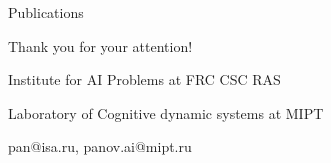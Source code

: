 \documentclass[default]{beamer}
\begin{document}
	\begin{frame}{Publications}
		
		\nocite{*}
		\printbibliography[keyword={fulllist}, resetnumbers=true]
	\end{frame}

	\begin{frame}
	
		\centering
		\Huge
		Thank you for your attention!
		\normalsize
		\par\bigskip
		\par\bigskip
		Institute for AI Problems at FRC CSC RAS
		\par\bigskip
		Laboratory of Cognitive dynamic systems at MIPT
		\par\bigskip
		pan@isa.ru, panov.ai@mipt.ru
	\end{frame}			
\end{document}

